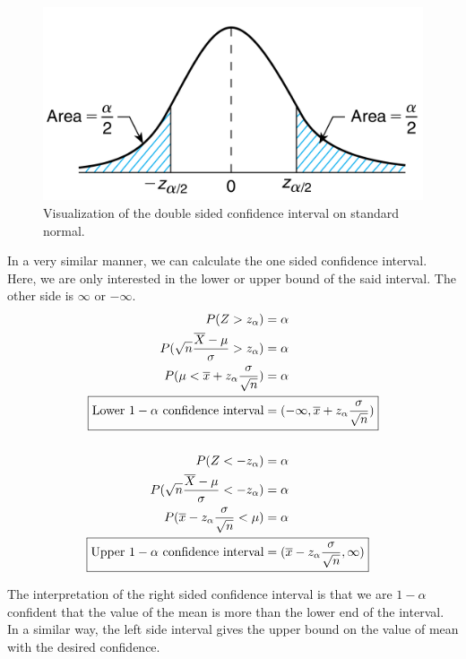 \documentclass[../probability-notes.tex]{subfiles}
\begin{document}
    \begin{figure}[h]
    \includegraphics[scale=0.4]{../images/conf_1}
    \centering
    \caption{Visualization of the double sided confidence interval on standard normal.}
    \label{fig:conf_1} %
    \end{figure}

    In a very similar manner, we can calculate the one sided confidence interval. Here, we are only interested in the lower or upper bound of the said interval. The other side is $\infty$ or $-\infty$.
    \begin{align*}
        P(Z > z_{\alpha}) &= \alpha\\
        P(\sqrt{n}\frac{\overline{X} - \mu}{\sigma} > z_{\alpha}) &= \alpha\\
        P(\mu < \overline{x} + z_{\alpha}\frac{\sigma}{\sqrt{n}}) &= \alpha\\
        \Aboxed{\text{Lower $1-\alpha$ confidence interval} &= (-\infty, \overline{x} + z_{\alpha}\frac{\sigma}{\sqrt{n}})}\\
        \\
        P(Z < -z_{\alpha}) &= \alpha\\
        P(\sqrt{n}\frac{\overline{X} - \mu}{\sigma} < -z_{\alpha}) &= \alpha\\
        P(\overline{x} - z_{\alpha}\frac{\sigma}{\sqrt{n}} < \mu) &= \alpha\\
        \Aboxed{\text{Upper $1-\alpha$ confidence interval} &= (\overline{x} - z_{\alpha}\frac{\sigma}{\sqrt{n}}, \infty)}
    \end{align*}

    The interpretation of the right sided confidence interval is that we are $1-\alpha$ confident that the value of the mean is more than the lower end of the interval. In a similar way, the left side interval gives the upper bound on the value of mean with the desired confidence.
\end{document}

